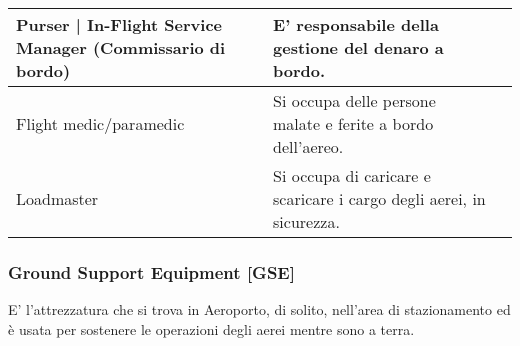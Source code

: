 \begin{table}[htp]
{\begin{tabular}{p{}p{}p{}}
			\hline
			\textsf{\small Purser | In-Flight Service Manager (Commissario di bordo)} & \textsf{\small E' responsabile della gestione del denaro a bordo. } & \textsf{\small } \\
			\hline
			\textsf{\small Flight medic/paramedic} & \textsf{\small Si occupa delle persone malate e ferite a bordo dell'aereo.} & \textsf{\small } \\
			\hline
			\textsf{\small Loadmaster} & \textsf{\small Si occupa di caricare e scaricare i cargo degli aerei, in sicurezza.} & \textsf{\small } \\
			\hline
		\end{tabular}%
	}%
\end{table}


\subsubsection{Ground Support Equipment [GSE]}

\textsf{\small E' l'attrezzatura che si trova in Aeroporto, di solito, nell'area di stazionamento ed è usata per sostenere le operazioni degli aerei mentre sono a terra. }

